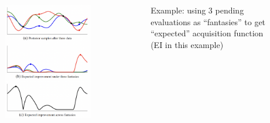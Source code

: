 \documentclass[aspectratio=169]{beamer}					%
\begin{document}
\begin{frame}
	\begin{columns}
		\begin{column}{.6\textwidth}
				\begin{figure}
				\centering
				\includegraphics[width = 0.78\textwidth]{figures/fantasies-EI.png}
			\end{figure}
		\end{column}
	
		\begin{column}{.4\textwidth}
		Example: using 3 pending evaluations as ``fantasies'' to get ``expected'' acquisition function (EI in this example)
		\end{column}
	\end{columns}
\end{frame}
\end{document}
